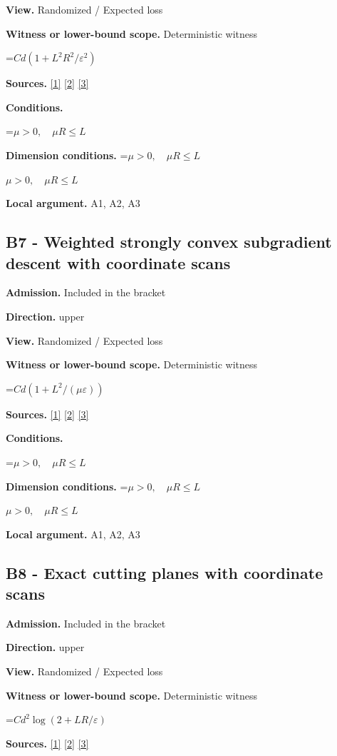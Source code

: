 \documentclass[10pt,a4paper]{article}
\newcommand{\AtlasMath}[1]{\par\begingroup\centering\setbox0=\hbox{$\displaystyle #1$}\ifdim\wd0>1.4\linewidth\typeout{ATLAS WIDE FORMULA: \the\wd0}\fi\ifdim\wd0>\linewidth\resizebox{\linewidth}{!}{\box0}\else\box0\fi\par\endgroup}
\newcommand{\AtlasInlineMath}[1]{\begingroup\setbox0=\hbox{$#1$}\ifdim\wd0>.4\linewidth\endgroup\AtlasMath{#1}\else\endgroup$#1$\fi}
\begin{document}
\textbf{View.} Randomized / Expected loss

\textbf{Witness or lower-bound scope.} Deterministic witness

\AtlasMath{Cd(1+L^2R^2/\varepsilon^2)}
\textbf{Sources.} \href{https://arxiv.org/pdf/1405.4980}{[1]} \href{https://www2.isye.gatech.edu/~nemirovs/MOR_AccuracyCertificates.pdf}{[2]} \href{https://arxiv.org/pdf/2609.20701}{[3]}

\textbf{Conditions.} 
\AtlasMath{\mu>0,\quad\mu R\le L}


\textbf{Dimension conditions.} \AtlasInlineMath{\mu>0,\quad\mu R\le L}

\textbf{Local argument.} A1, A2, A3

\subsection{B7 - Weighted strongly convex subgradient descent with coordinate scans}
\textbf{Admission.} Included in the bracket

\textbf{Direction.} upper

\textbf{View.} Randomized / Expected loss

\textbf{Witness or lower-bound scope.} Deterministic witness

\AtlasMath{Cd(1+L^2/(\mu\varepsilon))}
\textbf{Sources.} \href{https://arxiv.org/pdf/1405.4980}{[1]} \href{https://www2.isye.gatech.edu/~nemirovs/MOR_AccuracyCertificates.pdf}{[2]} \href{https://arxiv.org/pdf/2609.20701}{[3]}

\textbf{Conditions.} 
\AtlasMath{\mu>0,\quad\mu R\le L}


\textbf{Dimension conditions.} \AtlasInlineMath{\mu>0,\quad\mu R\le L}

\textbf{Local argument.} A1, A2, A3

\subsection{B8 - Exact cutting planes with coordinate scans}
\textbf{Admission.} Included in the bracket

\textbf{Direction.} upper

\textbf{View.} Randomized / Expected loss

\textbf{Witness or lower-bound scope.} Deterministic witness

\AtlasMath{Cd^2\log(2+LR/\varepsilon)}
\textbf{Sources.} \href{https://arxiv.org/pdf/1405.4980}{[1]} \href{https://www2.isye.gatech.edu/~nemirovs/MOR_AccuracyCertificates.pdf}{[2]} \href{https://arxiv.org/pdf/2609.20701}{[3]}
\end{document}
